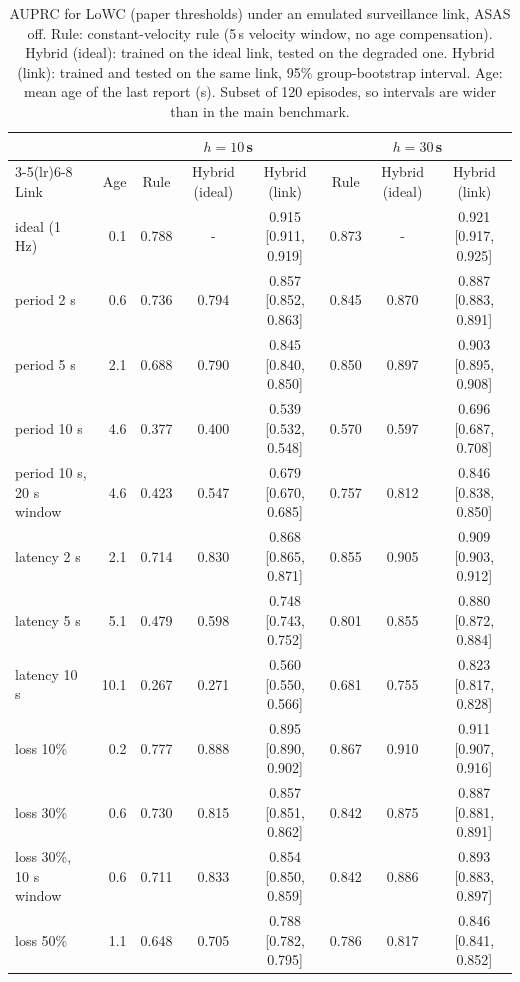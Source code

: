\begin{table}[t]
\centering\small
\caption{AUPRC for LoWC (paper thresholds) under an emulated surveillance link, ASAS off. Rule: constant-velocity rule (5\,s velocity window, no age compensation). Hybrid (ideal): trained on the ideal link, tested on the degraded one. Hybrid (link): trained and tested on the same link, 95\% group-bootstrap interval. Age: mean age of the last report (s). Subset of 120 episodes, so intervals are wider than in the main benchmark.}\label{tab:link_free}
\begin{tabular}{lrcccccc}
\toprule
 & & \multicolumn{3}{c}{$h=10$\,s} & \multicolumn{3}{c}{$h=30$\,s} \\
\cmidrule(lr){3-5}\cmidrule(lr){6-8}
Link & Age & Rule & Hybrid (ideal) & Hybrid (link) & Rule & Hybrid (ideal) & Hybrid (link) \\
\midrule
ideal (1 Hz) & 0.1 & 0.788 & - & 0.915 [0.911, 0.919] & 0.873 & - & 0.921 [0.917, 0.925] \\
period 2 s & 0.6 & 0.736 & 0.794 & 0.857 [0.852, 0.863] & 0.845 & 0.870 & 0.887 [0.883, 0.891] \\
period 5 s & 2.1 & 0.688 & 0.790 & 0.845 [0.840, 0.850] & 0.850 & 0.897 & 0.903 [0.895, 0.908] \\
period 10 s & 4.6 & 0.377 & 0.400 & 0.539 [0.532, 0.548] & 0.570 & 0.597 & 0.696 [0.687, 0.708] \\
period 10 s, 20 s window & 4.6 & 0.423 & 0.547 & 0.679 [0.670, 0.685] & 0.757 & 0.812 & 0.846 [0.838, 0.850] \\
latency 2 s & 2.1 & 0.714 & 0.830 & 0.868 [0.865, 0.871] & 0.855 & 0.905 & 0.909 [0.903, 0.912] \\
latency 5 s & 5.1 & 0.479 & 0.598 & 0.748 [0.743, 0.752] & 0.801 & 0.855 & 0.880 [0.872, 0.884] \\
latency 10 s & 10.1 & 0.267 & 0.271 & 0.560 [0.550, 0.566] & 0.681 & 0.755 & 0.823 [0.817, 0.828] \\
loss 10\% & 0.2 & 0.777 & 0.888 & 0.895 [0.890, 0.902] & 0.867 & 0.910 & 0.911 [0.907, 0.916] \\
loss 30\% & 0.6 & 0.730 & 0.815 & 0.857 [0.851, 0.862] & 0.842 & 0.875 & 0.887 [0.881, 0.891] \\
loss 30\%, 10 s window & 0.6 & 0.711 & 0.833 & 0.854 [0.850, 0.859] & 0.842 & 0.886 & 0.893 [0.883, 0.897] \\
loss 50\% & 1.1 & 0.648 & 0.705 & 0.788 [0.782, 0.795] & 0.786 & 0.817 & 0.846 [0.841, 0.852] \\
\bottomrule
\end{tabular}
\end{table}

